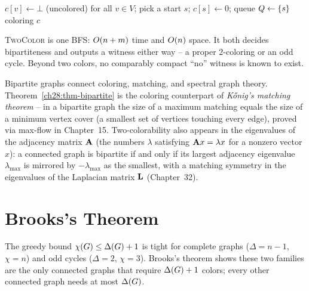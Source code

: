 \begin{algorithm}[H]
\caption{\textsc{TwoColor}$(\Gph)$ -- BFS bipartiteness test and coloring}
\label{ch28:alg-twocolor}
$c[v]\leftarrow \bot$ (uncolored) for all $v\in V$; pick a start $s$; $c[s]\leftarrow 0$; queue $Q\leftarrow\{s\}$\;
\Return coloring $c$\;
\end{algorithm}

\begin{complexitybox}
\textsc{TwoColor} is one BFS: $O(n+m)$ time and $O(n)$ space. It both decides
bipartiteness and outputs a witness either way -- a proper $2$-coloring or an
odd cycle. Beyond two colors, no comparably compact ``no'' witness is known to exist.
\end{complexitybox}

\begin{connectionbox}
Bipartite graphs connect coloring, matching, and spectral graph theory. Theorem~\ref{ch28:thm-bipartite} is the coloring counterpart of \emph{K\H{o}nig's matching theorem} -- in a
bipartite graph the size of a maximum matching equals the size of a minimum vertex cover (a smallest set of vertices touching every edge), proved via max-flow in
Chapter~15. Two-colorability also appears in the eigenvalues of the adjacency matrix $\mathbf{A}$ (the numbers $\lambda$ satisfying $\mathbf{A} x = \lambda x$ for a nonzero vector $x$):
a connected graph is bipartite if and only if its largest adjacency
eigenvalue $\lambda_{\max}$ is mirrored by $-\lambda_{\max}$ as the smallest, with a matching symmetry in the eigenvalues of the Laplacian matrix $\mathbf{L}$ (Chapter~32).
\end{connectionbox}

\section{Brooks's Theorem}
\label{ch28:brooks}

The greedy bound $\chi(G)\le\Delta(G)+1$ is tight for complete graphs ($\Delta=n-1$, $\chi=n$) and odd cycles ($\Delta=2$, $\chi=3$). Brooks's
theorem shows these two families are the only connected graphs that require $\Delta(G)+1$ colors;
every other connected graph needs at most $\Delta(G)$.

